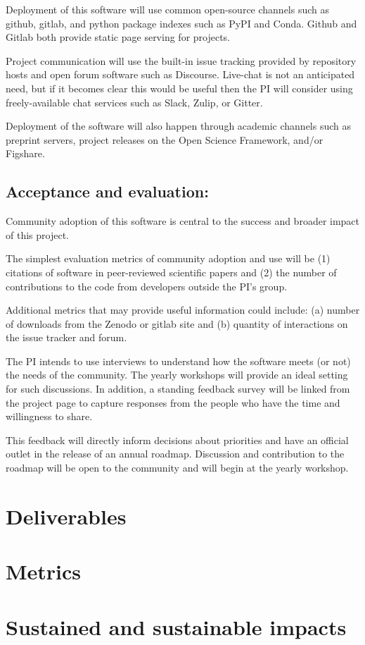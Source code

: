Deployment of this software will use common open-source channels such as github, gitlab, and python package indexes such as PyPI and Conda.  Github and Gitlab both provide static page serving for projects.

Project communication will use the built-in issue tracking provided by repository hosts and open forum software such as Discourse.  Live-chat is not an anticipated need, but if it becomes clear this would be useful then the PI will consider using freely-available chat services such as Slack, Zulip, or Gitter.

Deployment of the software will also happen through academic channels such as preprint servers, project releases on the Open Science Framework, and/or Figshare.



\subsection{Acceptance and evaluation:}

Community adoption of this software is central to the success and broader impact of this project.

The simplest evaluation metrics of community adoption and use will be (1) citations of software in peer-reviewed scientific papers and (2) the number of contributions to the code from developers outside the PI's group.

Additional metrics that may provide useful information could include: (a) number of downloads from the Zenodo or gitlab site and (b) quantity of interactions on the issue tracker and forum.

The PI intends to use interviews to understand how the software meets (or not) the needs of the community.  The yearly workshops will provide an ideal setting for such discussions.  In addition, a standing feedback survey will be linked from the project page to capture responses from the people who have the time and willingness to share.

This feedback will directly inform decisions about priorities and have an official outlet in the release of an annual roadmap.  Discussion and contribution to the roadmap will be open to the community and will begin at the yearly workshop.


\section{Deliverables}


\section{Metrics}


\section{Sustained and sustainable impacts}